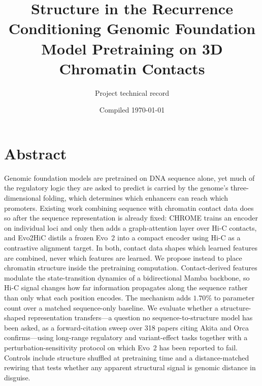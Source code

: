\documentclass[11pt,a4paper]{article}
\title{\vspace{-12mm}\textbf{Structure in the Recurrence}\\[2mm]
\large Conditioning Genomic Foundation Model Pretraining on 3D Chromatin Contacts}
\author{Project technical record}
\date{Compiled \today}
\begin{document}
\maketitle
\thispagestyle{fancy}

\begin{center}
\end{center}

\vspace{4mm}

\section*{Abstract}
Genomic foundation models are pretrained on DNA sequence alone, yet much of the
regulatory logic they are asked to predict is carried by the genome's
three-dimensional folding, which determines which enhancers can reach which
promoters. Existing work combining sequence with chromatin contact data does so
after the sequence representation is already fixed: CHROME trains an encoder on
individual loci and only then adds a graph-attention layer over Hi-C contacts,
and Evo2HiC distils a frozen Evo~2 into a compact encoder using Hi-C as a
contrastive alignment target. In both, contact data shapes which learned
features are combined, never which features are learned. We propose instead to
place chromatin structure inside the pretraining computation. Contact-derived
features modulate the state-transition dynamics of a bidirectional Mamba
backbone, so Hi-C signal changes how far information propagates along the
sequence rather than only what each position encodes. The mechanism adds
$1.70\%$ to parameter count over a matched sequence-only baseline. We evaluate
whether a structure-shaped representation transfers---a question no
sequence-to-structure model has been asked, as a forward-citation sweep over 318
papers citing Akita and Orca confirms---using long-range regulatory and
variant-effect tasks together with a perturbation-sensitivity protocol on which
Evo~2 has been reported to fail. Controls include structure shuffled at
pretraining time and a distance-matched rewiring that tests whether any apparent
structural signal is genomic distance in disguise.
\end{document}
